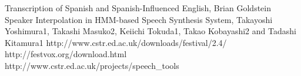 \begin{thebibliography}{9}
 Transcription of Spanish and Spanish-Influenced English, Brian Goldstein
 Speaker Interpolation in HMM-based Speech Synthesis System, Takayoshi Yoshimura1, Takashi Masuko2, Keiichi Tokuda1, Takao Kobayashi2 and Tadashi Kitamura1
 http://www.cstr.ed.ac.uk/downloads/festival/2.4/
 http://festvox.org/download.html
 http://www.cstr.ed.ac.uk/projects/speech\_tools
\end{thebibliography}
